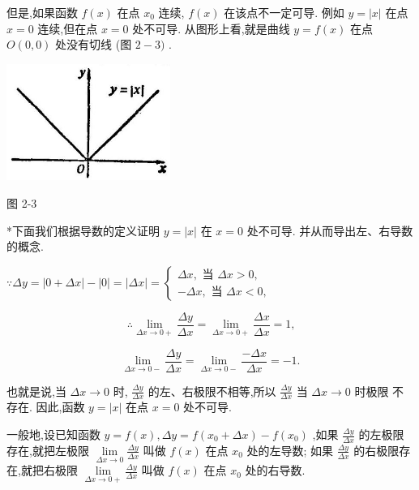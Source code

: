 \documentclass[lang=cn,newtx,10pt,scheme=chinese]{elegantbook}
\begin{document}
但是,如果函数 \(f\left( x\right)\) 在点 \({x}_{0}\) 连续, \(f\left( x\right)\) 在该点不一定可导. 例如 \(y = \left| x\right|\) 在点 \(x = 0\) 连续,但在点 \(x = 0\) 处不可导. 从图形上看,就是曲线 \(y = f\left( x\right)\) 在点 \(O\left( {0,0}\right)\) 处没有切线 (图 \(2 - 3)\) .

\begin{center}
\includegraphics[max width=0.4\textwidth]{images/01912c18-5c3f-733d-b775-749ba9897a9d_69_933568.jpg}
\end{center}

图 2-3

*下面我们根据导数的定义证明 \(y = \left| x\right|\) 在 \(x = 0\) 处不可导. 并从而导出左、右导数的概念.

\(\because {\Delta y} = \left| {0 + {\Delta x}}\right| - \left| 0\right| = \left| {\Delta x}\right| = \left\{ \begin{array}{r} {\Delta x},\text{ 当 }{\Delta x} > 0, \\ - {\Delta x},\text{ 当 }{\Delta x} < 0, \end{array}\right.\)

\[
\therefore \mathop{\lim }\limits_{{{\Delta x} \rightarrow 0 + }}\frac{\Delta y}{\Delta x} = \mathop{\lim }\limits_{{{\Delta x} \rightarrow 0 + }}\frac{\Delta x}{\Delta x} = 1\text{,}
\]

\[
\mathop{\lim }\limits_{{{\Delta x} \rightarrow 0 - }}\frac{\Delta y}{\Delta x} = \mathop{\lim }\limits_{{{\Delta x} \rightarrow 0 - }}\frac{-{\Delta x}}{\Delta x} = - 1.
\]

也就是说,当 \({\Delta x} \rightarrow 0\) 时, \(\frac{\Delta y}{\Delta x}\) 的左、右极限不相等,所以 \(\frac{\Delta y}{\Delta x}\) 当 \({\Delta x} \rightarrow 0\) 时极限 不存在. 因此,函数 \(y = \left| x\right|\) 在点 \(x = 0\) 处不可导.

\begin{definition}[单侧导数]
一般地,设已知函数 \(y = f\left( x\right) ,{\Delta y} = f\left( {{x}_{0} + {\Delta x}}\right) - f\left( {x}_{0}\right)\) ,如果 \(\frac{\Delta y}{\Delta x}\) 的左极限存在,就把左极限 \(\mathop{\lim }\limits_{{{\Delta x} \rightarrow 0}}\frac{\Delta y}{\Delta x}\) 叫做 \(f\left( x\right)\) 在点 \({x}_{0}\) 处的左导数; 如果 \(\frac{\Delta y}{\Delta x}\) 的右极限存在,就把右极限 \(\mathop{\lim }\limits_{{{\Delta x} \rightarrow 0 + }}\frac{\Delta y}{\Delta x}\) 叫做 \(f\left( x\right)\) 在点 \({x}_{0}\) 处的右导数.
\end{definition}
\end{document}
